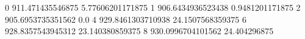 0 911.471435546875 5.77606201171875
1 906.6434936523438 0.9481201171875
2 905.6953735351562 0.0
4 929.8461303710938 24.1507568359375
6 928.8357543945312 23.140380859375
8 930.0996704101562 24.404296875

